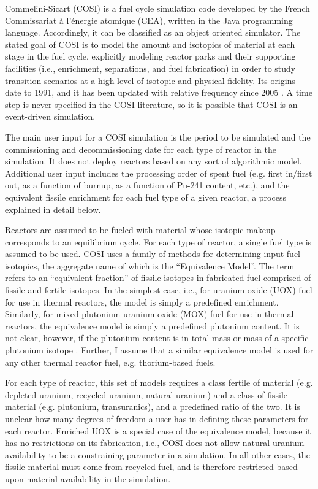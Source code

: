 Commelini-Sicart (COSI) is a fuel cycle simulation code developed by the French
Commissariat \`{a} l'\'{e}nergie atomique (CEA), written in the Java programming
language. Accordingly, it can be classified as an object oriented simulator. The
stated goal of COSI is to model the amount and isotopics of material at each
stage in the fuel cycle, explicitly modeling reactor parks and their supporting
facilities (i.e., enrichment, separations, and fuel fabrication) in order to
study transition scenarios at a high level of isotopic and physical
fidelity. Its origins date to 1991, and it has been updated with relative
frequency since 2005 \cite{boucher_cosi_2005,boucher_cosi:_2006,meyer_new_2009,
coquelet-pascal_validation_2011}. A time step is never specified in the COSI
literature, so it is possible that COSI is an event-driven simulation.

The main user input for a COSI simulation is the period to be simulated and the
commissioning and decommissioning date for each type of reactor in the
simulation. It does not deploy reactors based on any sort of algorithmic
model. Additional user input includes the processing order of spent fuel
(e.g. first in/first out, as a function of burnup, as a function of Pu-241
content, etc.), and the equivalent fissile enrichment for each fuel type of a
given reactor, a process explained in detail below.

Reactors are assumed to be fueled with material whose isotopic makeup
corresponds to an equilibrium cycle. For each type of reactor, a single fuel
type is assumed to be used. COSI uses a family of methods for determining input
fuel isotopics, the aggregate name of which is the ``Equivalence Model''. The
term refers to an ``equivalent fraction'' of fissile isotopes in fabricated fuel
comprised of fissile and fertile isotopes. In the simplest case, i.e., for
uranium oxide (UOX) fuel for use in thermal reactors, the model is simply a
predefined enrichment.  Similarly, for mixed plutonium-uranium oxide (MOX) fuel
for use in thermal reactors, the equivalence model is simply a predefined
plutonium content. It is not clear, however, if the plutonium content is in
total mass or mass of a specific plutonium isotope \cite{meyer_new_2009,
  coquelet-pascal_validation_2011}. Further, I assume that a similar equivalence
model is used for any other thermal reactor fuel, e.g. thorium-based fuels.

For each type of reactor, this set of models requires a class fertile of
material (e.g. depleted uranium, recycled uranium, natural uranium) and a class
of fissile material (e.g. plutonium, transuranics), and a predefined ratio of
the two. It is unclear how many degrees of freedom a user has in defining these
parameters for each reactor. Enriched UOX is a special case of the equivalence
model, because it has no restrictions on its fabrication, i.e., COSI does not
allow natural uranium availability to be a constraining parameter in a
simulation. In all other cases, the fissile material must come from recycled
fuel, and is therefore restricted based upon material availability in the
simulation.

